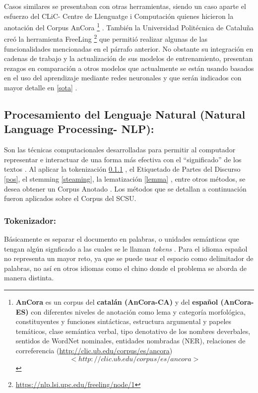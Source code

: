 \documentclass[
  10,
  openany]{book}
\begin{document}
Casos similares se presentaban con otras herramientas, siendo un caso aparte el esfuerzo del CLiC- Centre de Llenguatge i Computación quienes hicieron la anotación del Corpus AnCora \footnote{\textbf{AnCora} es un corpus del \textbf{catalán (AnCora-CA)} y del \textbf{español (AnCora-ES)} con diferentes niveles de anotación como lema y categoría morfológica, constituyentes y funciones sintácticas, estructura argumental y papeles temáticos, clase semántica verbal, tipo denotativo de los nombres deverbales, sentidos de WordNet nominales, entidades nombradas (NER), relaciones de correferencia (\url{http://clic.ub.edu/corpus/es/ancora})\[<http://clic.ub.edu/corpus/es/ancora>\]} . También la Universidad Politécnica de Cataluña creó la herramienta FreeLing \footnote{\url{https://nlp.lsi.upc.edu/freeling/node/1}} que permitió realizar algunas de las funcionalidades mencionadas en el párrafo anterior. No obstante su integración en cadenas de trabajo y la actualización de sus modelos de entrenamiento, presentan rezagos en comparación a otros modelos que actualmente se están usando basados en el uso del aprendizaje mediante redes neuronales \citep{chen2014fast} y que serán indicados con mayor detalle en \ref{sota} .

\hypertarget{nlproc}{%
\subsection{Procesamiento del Lenguaje Natural (Natural Language Processing- NLP):}\label{nlproc}}

Son las técnicas computacionales desarrolladas para permitir al computador representar e interactuar de una forma más efectiva con el ``significado'' de los textos . Al aplicar la tokenización \ref{token} , el Etiquetado de Partes del Discurso \ref{pos}, el stemming \ref{steaming}, la lematización \ref{lemma} , entre otros métodos, se desea obtener un Corpus Anotado \citep{desagulier2017}. Los métodos que se detallan a continuación fueron aplicados sobre el Corpus del SCSU.

\hypertarget{token}{%
\subsubsection{Tokenizador:}\label{token}}

Básicamente es separar el documento en palabras, o unidades semánticas que tengan algún signficado a las cuales se le llaman \emph{tokens} \citep{straka2017}. Para el idioma español no representa un mayor reto, ya que se puede usar el espacio como delimitador de palabras, no así en otros idiomas como el chino donde el problema se aborda de manera distinta.
\end{document}
